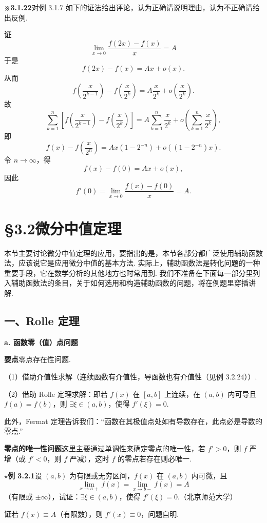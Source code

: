 \documentclass[UTF8, 12pt, fontset=fandol, oneside]{ctexart}
\begin{document}
\noindent\textbf{※3.1.22}\quad 对例 3.1.7 如下的证法给出评论，认为正确请说明理由，认为不正确请给出反例.

\noindent\textbf{证}\quad
\[
  \lim_{x\to0}\frac{f(2x)-f(x)}{x}=A
\]
于是
\[
  f(2x)-f(x)=Ax+o(x).
\]
从而
\[
  f\left(\frac{x}{2^{k-1}}\right)-f\left(\frac{x}{2^k}\right)
  =A\frac{x}{2^k}+o\left(\frac{x}{2^k}\right).
\]
故
\[
  \sum_{k=1}^n\left[
  f\left(\frac{x}{2^{k-1}}\right)-f\left(\frac{x}{2^k}\right)\right]
  =A\sum_{k=1}^n\frac{x}{2^k}+o\left(\sum_{k=1}^n\frac{x}{2^k}\right),
\]
即
\[
  f(x)-f\left(\frac{x}{2^n}\right)
  =Ax(1-2^{-n})+o((1-2^{-n})x).
\]
令 $n\to\infty$，得
\[
  f(x)-f(0)=Ax+o(x),
\]
因此
\[
  f'(0)=\lim_{x\to0}\frac{f(x)-f(0)}{x}=A.
\]

\section*{§3.2\quad 微分中值定理}

本节主要讨论微分中值定理的应用，要指出的是，本节各部分都广泛使用辅助函数法，应该说它是应用微分中值的基本方法. 实际上，辅助函数法是转化问题的一种重要手段，它在数学分析的其他地方也时常用到. 我们不准备在下面每一部分里列入辅助函数法的条目，关于如何选用和构造辅助函数的问题，将在例题里穿插讲解.

\subsection*{一、Rolle 定理}

\noindent\textbf{a. 函数零（值）点问题}

\noindent\textbf{要点}\quad 零点存在性问题.

（1）借助介值性求解（连续函数有介值性，导函数也有介值性（见例 3.2.24））.

（2）借助 Rolle 定理求解：即若 $f(x)$ 在 $[a,b]$ 上连续，在 $(a,b)$ 内可导且 $f(a)=f(b)$，则 $\exists\xi\in(a,b)$，使得 $f'(\xi)=0$.

此外，Fermat 定理告诉我们：“函数在其极值点处如有导数存在，此点必是导数的零点.”

\noindent\textbf{零点的唯一性问题}\quad 这里主要通过单调性来确定零点的唯一性，若 $f'>0$，则 $f$ 严增（或 $f'<0$，则 $f$ 严减），这时 $f$ 的零点若存在则必唯一.

\noindent\textbf{$\star$例 3.2.1}\quad 设 $(a,b)$ 为有限或无穷区间，$f(x)$ 在 $(a,b)$ 内可微，且
\[
  \lim_{x\to a+}f(x)=\lim_{x\to b-}f(x)=A
\]
（有限或 $\pm\infty$），试证：$\exists\xi\in(a,b)$，使得 $f'(\xi)=0$.（北京师范大学）

\noindent\textbf{证}\quad 若 $f(x)\equiv A$（有限数），则 $f'(x)\equiv0$，问题自明.
\end{document}
